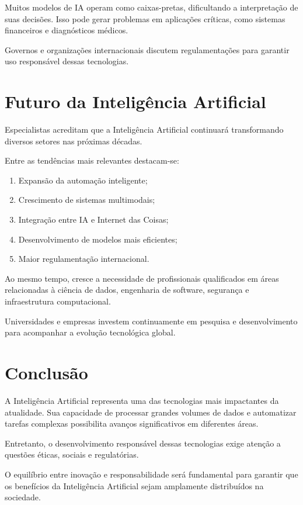\documentclass[11pt]{article}
\begin{document}
Muitos modelos de IA operam como caixas-pretas, dificultando a interpretação de suas decisões.
Isso pode gerar problemas em aplicações críticas, como sistemas financeiros e diagnósticos
médicos.

Governos e organizações internacionais discutem regulamentações para garantir uso
responsável dessas tecnologias. 

\section{Futuro da Inteligência Artificial}

Especialistas acreditam que a Inteligência Artificial continuará transformando diversos setores
nas próximas décadas.

Entre as tendências mais relevantes destacam-se:

\begin{enumerate}
    \item Expansão da automação inteligente;
    \item Crescimento de sistemas multimodais;
    \item Integração entre IA e Internet das Coisas;
    \item Desenvolvimento de modelos mais eficientes;
    \item Maior regulamentação internacional.
\end{enumerate}

Ao mesmo tempo, cresce a necessidade de profissionais qualificados em áreas relacionadas à
ciência de dados, engenharia de software, segurança e infraestrutura computacional.

Universidades e empresas investem continuamente em pesquisa e desenvolvimento para
acompanhar a evolução tecnológica global. 

\section{Conclusão}

A Inteligência Artificial representa uma das tecnologias mais impactantes da atualidade. Sua
capacidade de processar grandes volumes de dados e automatizar tarefas complexas possibilita
avanços significativos em diferentes áreas.

Entretanto, o desenvolvimento responsável dessas tecnologias exige atenção a questões éticas,
sociais e regulatórias.

O equilíbrio entre inovação e responsabilidade será fundamental para garantir que os benefícios
da Inteligência Artificial sejam amplamente distribuídos na sociedade. 
\end{document}
